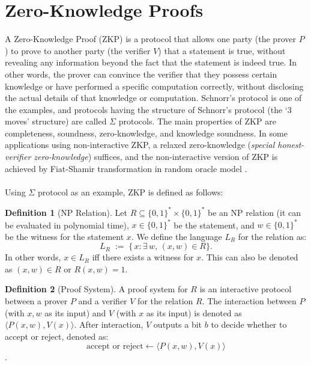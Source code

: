 \documentclass[12pt]{article}
\theoremstyle{definition}
\newtheorem{definition}{Definition}[section]
\begin{document}
\section{Zero-Knowledge Proofs}\label{sec:zkp}
A Zero-Knowledge Proof (ZKP) \cite{zkp85} is a protocol that allows one party (the prover $P$) to prove to another party (the verifier $V$) that a statement is true, without revealing any information beyond the fact that the statement is indeed true. In other words, the prover can convince the verifier that they possess certain knowledge or have performed a specific computation correctly, without disclosing the actual details of that knowledge or computation. Schnorr's protocol is one of the examples, and protocols having the structure of Schnorr's protocol (the `3 moves' structure) are called $\Sigma$ protocols. The main properties of ZKP are completeness, soundness, zero-knowledge, and knowledge soundness. In some applications using non-interactive ZKP, a relaxed zero-knowledge (\textit{special honest-verifier zero-knowledge}) suffices, and the non-interactive version of ZKP is achieved by Fiat-Shamir transformation \cite{FS} in random oracle model \cite{RO}.\\
\\
Using $\Sigma$ protocol as an example, ZKP is defined as follows:\\
\begin{definition}[NP Relation]
Let \(R \subseteq \{0,1\}^* \times \{0,1\}^*\) be an NP relation (it can be evaluated in polynomial time), $x \in \{0,1\}^*$ be the statement, and $w\in\{0,1\}^*$ be the witness for the statement $x$. We define the language $L_R$ for the relation as:
\[
 L_R \;:=\; \{\,x : \exists\,w,\,(x,w)\in R\}.
\]
In other words, $x \in L_R$ iff there exists a witness for $x$. This can also be denoted as $(x,w)\in R$ or $R(x,w)=1$.
\end{definition}

\begin{definition}[Proof System]
A proof system for \(R\) is an interactive protocol between a prover \(P\) and a verifier \(V\) for the relation $R$. The interaction between $P$ (with $x,w$ as its input) and $V$ (with $x$ as its input) is denoted as $\langle P(x,w),V(x)\rangle$. After interaction, $V$ outputs a bit $b$ to decide whether to accept or reject, denoted as: 
\[
\text{accept or reject} \leftarrow \langle P(x,w),V(x)\rangle 
\].
\end{definition}
\end{document}
